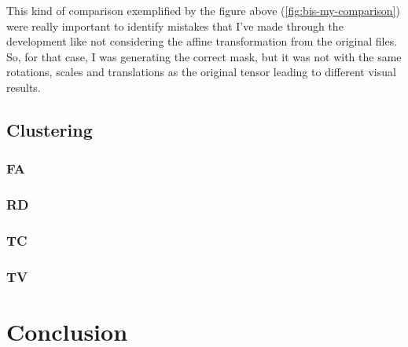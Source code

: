 \documentclass[a4paper,11pt]{report}
\begin{document}
  This kind of comparison exemplified by the figure above (\ref{fig:bis-my-comparison}) were really important to identify mistakes that I've made through the development like not considering the affine transformation from the original files. So, for that case, I was generating the correct mask, but it was not with the same rotations, scales and translations as the original tensor leading to different visual results.

  \section{Clustering}
    \subsection{FA}

    \subsection{RD}

    \subsection{TC}

    \subsection{TV}

\chapter{Conclusion}
\end{document}
